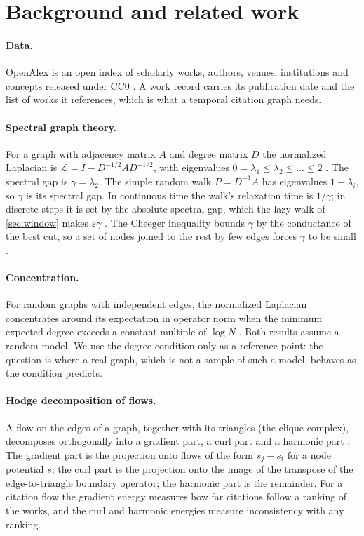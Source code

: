 \documentclass[11pt]{article}
\begin{document}
\section{Background and related work}
\paragraph{Data.} OpenAlex is an open index of scholarly works, authors, venues, institutions and
concepts released under CC0 \citep{priem2022openalex}. A work record carries its publication date
and the list of works it references, which is what a temporal citation graph needs.

\paragraph{Spectral graph theory.} For a graph with adjacency matrix $A$ and degree matrix $D$ the
normalized Laplacian is $\mathcal L = I - D^{-1/2} A D^{-1/2}$, with eigenvalues
$0 = \lambda_1 \le \lambda_2 \le \dots \le 2$ \citep{chung1997}. The spectral gap is
$\gamma = \lambda_2$. The simple random walk $P = D^{-1}A$ has eigenvalues $1 - \lambda_i$, so
$\gamma$ is its spectral gap. In continuous time the walk's relaxation time is $1/\gamma$; in discrete
steps it is set by the absolute spectral gap, which the lazy walk of \cref{sec:window} makes
$\varepsilon\gamma$ \citep{levin2017}. The
Cheeger inequality bounds $\gamma$ by the conductance of the best cut, so a set of nodes joined to
the rest by few edges forces $\gamma$ to be small \citep{chung1997}.

\paragraph{Concentration.} For random graphs with independent edges, the normalized Laplacian
concentrates around its expectation in operator norm when the minimum expected degree exceeds a
constant multiple of $\log N$ \citep{oliveira2009,chungradcliffe2011}. Both results assume a
random model. We use the degree condition only as a reference point: the question is where a real
graph, which is not a sample of such a model, behaves as the condition predicts.

\paragraph{Hodge decomposition of flows.} A flow on the edges of a graph, together with its
triangles (the clique complex), decomposes orthogonally into a gradient part, a curl part and a
harmonic part \citep{lim2020,jiang2011}. The gradient part is the projection onto flows of the form
$s_j - s_i$ for a node potential $s$; the curl part is the projection onto the image of the
transpose of the edge-to-triangle boundary operator; the harmonic part is the remainder. For a
citation flow the gradient energy measures how far citations follow a ranking of the works, and
the curl and harmonic energies measure inconsistency with any ranking.
\end{document}
